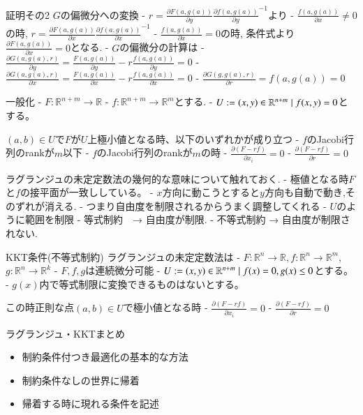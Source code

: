 証明その2 $G$の偏微分への変換
- $r= \frac{\partial F(a, g(a))}{\partial y} \frac{\partial f(a, g(a))}{\partial y}^{-1}$より
  - $\frac{f(a, g(a))}{\partial x} \neq 0$の時, $r= \frac{\partial F(a, g(a))}{\partial x} \frac{\partial f(a, g(a))}{\partial x}^{-1}$
  - $\frac{f(a, g(a))}{\partial x} = 0$の時, 条件式より$\frac{\partial F(a, g(a))}{\partial x} = 0$となる.
- $G$の偏微分の計算は
  - $\frac{\partial G(a, g(a), r)}{\partial y} = \frac{F(a, g(a))}{\partial y} - r \frac{f(a, g(a))}{\partial y} = 0$
  - $\frac{\partial G(a, g(a), r)}{\partial x} = \frac{F(a, g(a))}{\partial x} - r \frac{f(a, g(a))}{\partial x} = 0$
  - $\frac{\partial G(g, g(a), r)}{\partial r} = f(a, g(a)) = 0$

一般化
- $F: \mathbb{R}^{n+m} \to \mathbb{R}$
- $f: \mathbb{R}^{n+m} \to \mathbb{R}^m$とする.
- $U := \\{ (x,y) \in \mathbb{R}^{n+m} \mid f(x,y) = 0\\}$とする。

$(a, b) \in U$で$F$が$U$上極小値となる時、以下のいずれかが成り立つ
- $f$のJacobi行列のrankが$m$以下
- $f$のJacobi行列のrankが$m$の時
  - $\frac{ \partial (F - r f)}{\partial x_i} = 0$
  - $\frac{ \partial (F - r f)}{\partial r} = 0$

ラグランジュの未定定数法の幾何的な意味について触れておく.
- 極値となる時$F$と$f$の接平面が一致ししている。
- $x$方向に動こうとすると$y$方向も自動で動き,そのずれが消える.
- つまり自由度を制限されるからうまく調整してくれる
- $U$のように範囲を制限
  - 等式制約　→ 自由度が制限.
  - 不等式制約 → 自由度が制限されない.

KKT条件(不等式制約)
ラグランジュの未定定数法は
- $F: \mathbb{R}^{n} \to \mathbb{R}, f: \mathbb{R}^{n} \to \mathbb{R}^m$, $g: \mathbb{R}^{n} \to \mathbb{R}^k$
- $F,f, g$は連続微分可能
- $U := \\{(x,y) \in \mathbb{R}^{n+m} \mid f(x) = 0, g(x) \le 0\\}$とする。
- $g(x)$内で等式制限に変換できるものはないとする。

この時正則な点$(a,b) \in U$で極小値となる時
  - $\frac{ \partial (F - r f)}{\partial x_i} = 0$
  - $\frac{ \partial (F - r f)}{\partial r} = 0$

\begin{rem}
ラグランジュ・KKTまとめ
\begin{itemize}
\item 制約条件付つき最適化の基本的な方法
\item 制約条件なしの世界に帰着
\item 帰着する時に現れる条件を記述
\end{itemize}
\end{rem}

